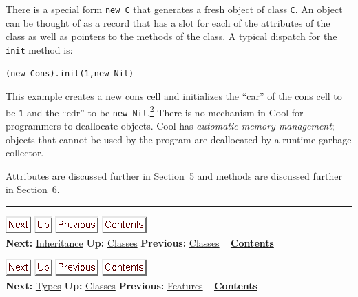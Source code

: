 \documentclass[]{article}
\begin{document}
There is a special form \texttt{new C} that generates a fresh object of
class \texttt{C}. An object can be thought of as a record that has a
slot for each of the attributes of the class as well as pointers to the
methods of the class. A typical dispatch for the \texttt{init} method
is:

\begin{verbatim}
(new Cons).init(1,new Nil)
\end{verbatim}

This example creates a new cons cell and initializes the ``car'' of the
cons cell to be \texttt{1} and the ``cdr'' to be
\texttt{new Nil}.\href{footnode.html\#foot1771}{\textsuperscript{2}}
There is no mechanism in Cool for programmers to deallocate objects.
Cool has \emph{automatic memory management}; objects that cannot be used
by the program are deallocated by a runtime garbage collector.

Attributes are discussed further in
Section~\href{node10.html\#sec-attr}{5} and methods are discussed
further in Section~\href{node12.html\#sec-method}{6}.

\begin{center}\rule{3in}{0.4pt}\end{center}

\href{node6.html}{\includegraphics{next.png}}
\href{node4.html}{\includegraphics{up.png}}
\href{node4.html}{\includegraphics{prev.png}}
\href{node1.html}{\includegraphics{contents.png}} \\ \textbf{Next:}
\href{node6.html}{Inheritance} \textbf{Up:} \href{node4.html}{Classes}
\textbf{Previous:} \href{node4.html}{Classes} ~
\textbf{\href{node1.html}{Contents}}

\href{node7.html}{\includegraphics{next.png}}
\href{node4.html}{\includegraphics{up.png}}
\href{node5.html}{\includegraphics{prev.png}}
\href{node1.html}{\includegraphics{contents.png}} \\ \textbf{Next:}
\href{node7.html}{Types} \textbf{Up:} \href{node4.html}{Classes}
\textbf{Previous:} \href{node5.html}{Features} ~
\textbf{\href{node1.html}{Contents}} \\ \\
\end{document}
